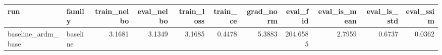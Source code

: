 \begin{tabular}{llrrrrrrrrr}
\toprule
run & family & train_nelbo & eval_nelbo & train_loss & train_ce & grad_norm & eval_fid & eval_is_mean & eval_is_std & eval_ssim \\
\midrule
baseline_ardm_base & baseline & 3.1681 & 3.1349 & 3.1685 & 0.4478 & 5.3883 & 204.6585 & 2.7959 & 0.6737 & 0.0362 \\
\bottomrule
\end{tabular}
